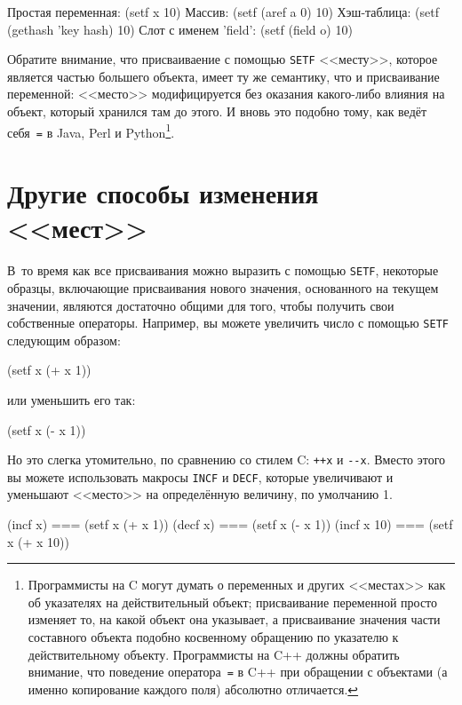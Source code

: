 \begin{myverb}
Простая переменная:    (setf x 10) 
Массив:                (setf (aref a 0) 10)
Хэш-таблица:           (setf (gethash 'key hash) 10)
Слот с именем 'field': (setf (field o) 10)
\end{myverb}

Обратите внимание, что присваиваение с помощью \lstinline{SETF} <<месту>>, которое является
частью большего объекта, имеет ту же семантику, что и присваивание переменной: <<место>>
модифицируется без оказания какого-либо влияния на объект, который хранился там до
этого. И вновь это подобно тому, как ведёт себя~\lstinline{=} в Java, Perl и
Python\footnote{Программисты на C могут думать о переменных и других <<местах>> как об
  указателях на действительный объект; присваивание переменной просто изменяет
  то, на какой объект она указывает, а присваивание значения части составного объекта
  подобно косвенному обращению по указателю к действительному объекту. Программисты на C++
  должны обратить внимание, что поведение оператора~\lstinline{=} в C++ при обращении с объектами (а
  именно копирование каждого поля) абсолютно отличается.}\hspace{\footnotenegspace}.

\section{Другие способы изменения <<мест>>}

В~то время как все присваивания можно выразить с помощью \lstinline{SETF}, некоторые образцы,
включающие присваивания нового значения, основанного на текущем значении, являются
достаточно общими для того, чтобы получить свои собственные операторы. Например, вы можете
увеличить число с помощью \lstinline{SETF} следующим образом:

\begin{myverb}
(setf x (+ x 1))
\end{myverb}

\noindent{}или уменьшить его так:

\begin{myverb}
(setf x (- x 1))
\end{myverb}

Но это слегка утомительно, по сравнению со стилем C: \lstinline{++x} и \lstinline{--x}. Вместо этого
вы можете использовать макросы \lstinline{INCF} и \lstinline{DECF}, которые увеличивают и
уменьшают <<место>> на определённую величину, по умолчанию 1.

\begin{myverb}
(incf x)    === (setf x (+ x 1))
(decf x)    === (setf x (- x 1))
(incf x 10) === (setf x (+ x 10))
\end{myverb}

